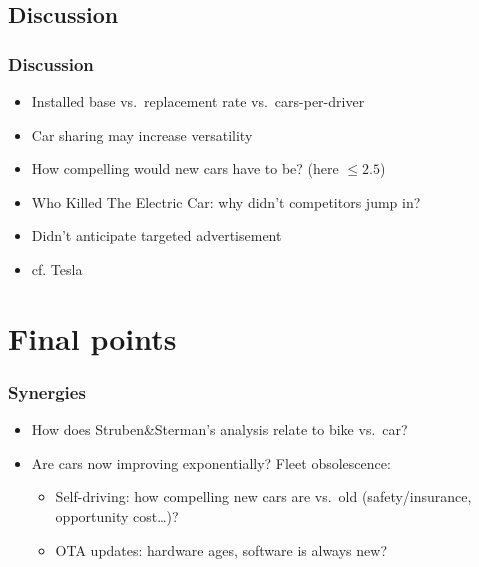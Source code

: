 \documentclass{beamer}
\begin{document}
\subsection{Discussion}
\begin{frame}
  \frametitle{Discussion}
  \begin{itemize}
  \item Installed base vs.~replacement rate vs.~cars-per-driver
  \item Car sharing may increase versatility
  \item How compelling would new cars have to be? (here $\leq 2.5$)
  \item Who Killed The Electric Car: why didn't competitors jump in?
  \item Didn't anticipate targeted advertisement
  \item cf. Tesla
  \end{itemize}
\end{frame}



\section{Final points}
\begin{frame}
  \frametitle{Synergies}
  \begin{itemize}
  \item How does Struben\&Sterman's analysis relate to bike vs.~car?
  \item Are cars now improving exponentially? Fleet obsolescence:
    \begin{itemize}
    \item Self-driving: how compelling new cars are vs.~old (safety/insurance, opportunity cost\dots)?
    \item OTA updates: hardware ages, software is always new?
    \end{itemize}
  \end{itemize}
\end{frame}
  
  
\end{document}
